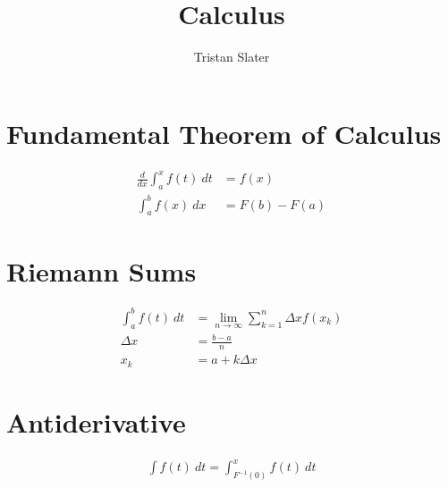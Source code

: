 \documentclass{article}
\title{Calculus}
\author{Tristan Slater}
\begin{document}
    \maketitle

    \section{Fundamental Theorem of Calculus}

    \begin{align}
        \frac{d}{dx}{\int_a^x{f(t)\ dt}} &= f(x) \\
        \int_a^b{f(x)\ dx} &= F(b) - F(a)
    \end{align}

    \section{Riemann Sums}

    \begin{align}
        \int_a^b{f(t)\ dt} &= \lim_{n \to \infty}{\sum_{k = 1}^n{\Delta x f(x_k)}} \\
        \Delta x &= \frac{b - a}{n} \\
        x_k &= a + k\Delta x
    \end{align}
    
    \section{Antiderivative}
    
    \begin{align}
        \int{f(t)\ dt} = \int_{F^{-1}(0)}^x{f(t)\ dt}
    \end{align}
\end{document}
